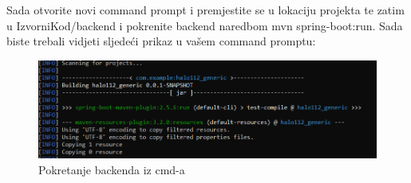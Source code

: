 			Sada otvorite novi command prompt i premjestite se u lokaciju projekta te zatim u IzvorniKod/backend i pokrenite backend naredbom mvn spring-boot:run. Sada biste trebali vidjeti sljedeći prikaz u vašem command promptu:
			
				\begin{figure}[H]
					\includegraphics[scale=0.8]{slike/pokretanje_backenda.png}
					\centering
					\caption{Pokretanje backenda iz cmd-a}
					\label{fig:test2}
				\end{figure}
			
			\eject 